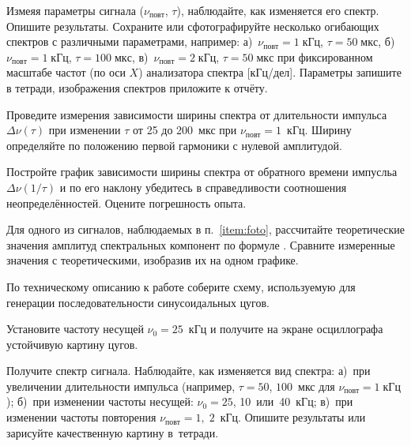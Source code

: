 \begin{lab:task}
\item\label{item:foto} Измеяя параметры сигнала ($\nu_{повт}$, $\tau$),
наблюдайте, как изменяется его спектр. Опишите результаты.
Сохраните или сфотографируйте несколько огибающих спектров с различными
параметрами, например:
а)~$\nu_{повт}=1\;кГц$, $\tau=50\;мкс$,
б)~$\nu_{повт}=1\;кГц$, $\tau=100\;мкс$,
в)~$\nu_{повт}=2\;кГц$, $\tau=50\;мкс$
при фиксированном масштабе частот (по оси $X$) анализатора спектра [кГц/дел].
Параметры запишите в тетради, изображения спектров приложите к отчёту.

\item Проведите измерения зависимости ширины спектра от длительности
импульса~$\Delta \nu(\tau)$ при изменении $\tau$ от 25 до 200~мкс при
$\nu_\text{повт}=1$~кГц. Ширину определяйте по положению первой гармоники
с нулевой амплитудой.

\item Постройте график зависимости ширины спектра от обратного времени импусльа
$\Delta \nu(1/\tau)$ и по его наклону убедитесь в справедливости соотношения
неопределённостей. Оцените погрешность опыта.

\item Для одного из сигналов, наблюдаемых в п.~\ref{item:foto}, рассчитайте теоретические
значения амплитуд спектральных компонент по формуле .
Сравните измеренные значения с теоретическими, изобразив их на одном графике.



\item По техническому описанию к работе соберите схему, используемую
для генерации последовательности синусоидальных цугов.

\item Установите частоту несущей $\nu_0=25$~кГц и получите на экране осциллографа
устойчивую картину цугов.

\item Получите спектр сигнала. Наблюдайте, как изменяется вид спектра:
а)~при увеличении длительности импульса (например, $\tau=50$, $100$~мкс
для $\nu_\text{повт}=1\;кГц$); б)~при изменении частоты несущей:
$\nu_0=25$, 10~или~40~кГц; в)~при изменении частоты повторения
$\nu_{повт}=1,\;2$~кГц. Опишите результаты или зарисуйте качественную
картину в~тетради.


\end{lab:task}

